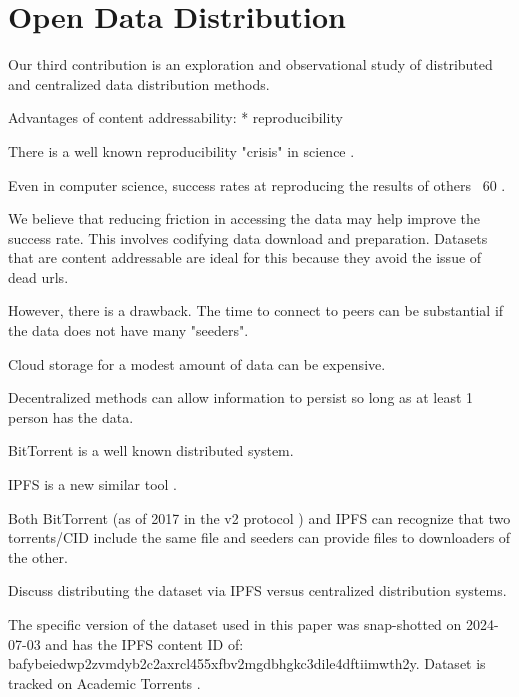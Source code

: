\documentclass[10pt,twocolumn,letterpaper]{article}
\begin{document}
\section{Open Data Distribution}


Our third contribution is an exploration and observational study of distributed
and centralized data distribution methods. 

Advantages of content addressability:
* reproducibility 

There is a well known reproducibility "crisis" in science \cite{baker_reproducibility_2016}.

Even in computer science, success rates at reproducing the results of others ~60%
\cite{NEURIPS2019_c429429b, collberg2016repeatability, desai_what_2024}.

We believe that reducing friction in accessing the data may help improve the
success rate. This involves codifying data download and preparation. Datasets
that are content addressable are ideal for this because they avoid the issue of
dead urls.

However, there is a drawback. The time to connect to peers can be substantial
if the data does not have many "seeders". 


Cloud storage for a modest amount of data can be expensive.

Decentralized methods can allow information to persist so long as at least 1
person has the data.

BitTorrent is a well known distributed system.

IPFS is a new similar tool \cite{benet_ipfs_2014,bieri_overview_2021}.


Both BitTorrent (as of 2017 in the v2 protocol \cite{cohen_bittorrent_2017})
and IPFS can recognize that two torrents/CID include the same file and seeders
can provide files to downloaders of the other.

Discuss distributing the dataset via IPFS versus centralized distribution
systems.


The specific version of the dataset used in this paper was snap-shotted on
2024-07-03 and has the IPFS content ID of:
bafybeiedwp2zvmdyb2c2axrcl455xfbv2mgdbhgkc3dile4dftiimwth2y.
Dataset is tracked on Academic Torrents \cite{academic_torrents_Cohen2014}.
\end{document}
